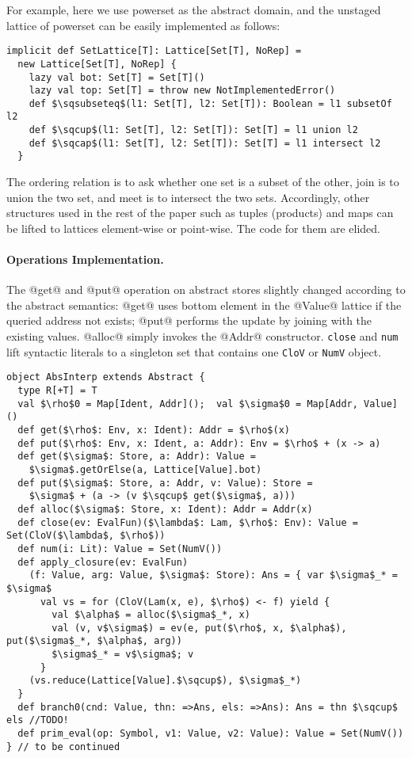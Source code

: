 For example, here we use powerset as the abstract domain, and the unstaged lattice 
of powerset can be easily implemented as follows:

\begin{lstlisting}
implicit def SetLattice[T]: Lattice[Set[T], NoRep] = 
  new Lattice[Set[T], NoRep] {
    lazy val bot: Set[T] = Set[T]()
    lazy val top: Set[T] = throw new NotImplementedError()
    def $\sqsubseteq$(l1: Set[T], l2: Set[T]): Boolean = l1 subsetOf l2
    def $\sqcup$(l1: Set[T], l2: Set[T]): Set[T] = l1 union l2
    def $\sqcap$(l1: Set[T], l2: Set[T]): Set[T] = l1 intersect l2
  }
\end{lstlisting}

The ordering relation is to ask whether one set is a subset of the other, 
join is to union the two set, and meet is to intersect the two sets.
Accordingly, other structures used in the rest of the paper such as tuples 
(products) and maps can be lifted to lattices element-wise or point-wise.
The code for them are elided.

\paragraph{Operations Implementation.}
The @get@ and @put@ operation on abstract stores slightly changed according to
the abstract semantics: @get@ uses bottom element in the @Value@ lattice if the queried
address not exists; @put@ performs the update by joining with the existing values.
@alloc@ simply invokes the @Addr@ constructor.
\texttt{close} and \texttt{num} lift syntactic literals to a singleton set that
contains one \texttt{CloV} or \texttt{NumV} object.

\begin{lstlisting}
object AbsInterp extends Abstract {
  type R[+T] = T
  val $\rho$0 = Map[Ident, Addr]();  val $\sigma$0 = Map[Addr, Value]()
  def get($\rho$: Env, x: Ident): Addr = $\rho$(x)
  def put($\rho$: Env, x: Ident, a: Addr): Env = $\rho$ + (x -> a)
  def get($\sigma$: Store, a: Addr): Value = 
    $\sigma$.getOrElse(a, Lattice[Value].bot)
  def put($\sigma$: Store, a: Addr, v: Value): Store =
    $\sigma$ + (a -> (v $\sqcup$ get($\sigma$, a)))
  def alloc($\sigma$: Store, x: Ident): Addr = Addr(x)
  def close(ev: EvalFun)($\lambda$: Lam, $\rho$: Env): Value = Set(CloV($\lambda$, $\rho$))
  def num(i: Lit): Value = Set(NumV())
  def apply_closure(ev: EvalFun)
    (f: Value, arg: Value, $\sigma$: Store): Ans = { var $\sigma$_* = $\sigma$
      val vs = for (CloV(Lam(x, e), $\rho$) <- f) yield {
        val $\alpha$ = alloc($\sigma$_*, x)
        val (v, v$\sigma$) = ev(e, put($\rho$, x, $\alpha$), put($\sigma$_*, $\alpha$, arg))
        $\sigma$_* = v$\sigma$; v
      }
    (vs.reduce(Lattice[Value].$\sqcup$), $\sigma$_*)
  }
  def branch0(cnd: Value, thn: =>Ans, els: =>Ans): Ans = thn $\sqcup$ els //TODO!
  def prim_eval(op: Symbol, v1: Value, v2: Value): Value = Set(NumV())
} // to be continued
\end{lstlisting}

